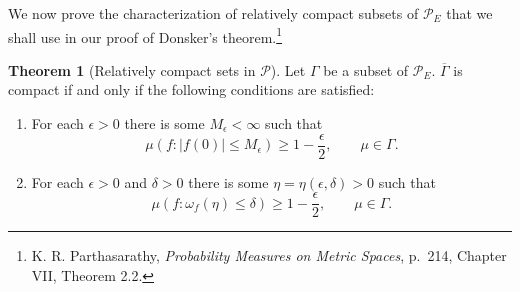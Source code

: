\documentclass{article}
\theoremstyle{definition}
\newtheorem{theorem}{Theorem}
\theoremstyle{definition}
\begin{document}
We now prove the characterization of relatively compact subsets of $\mathscr{P}_E$ that we shall use in our proof of Donsker's theorem.\footnote{K. R.
Parthasarathy, {\em Probability Measures on Metric Spaces}, p.~214, Chapter VII, Theorem 2.2.}

\begin{theorem}[Relatively compact sets in $\mathscr{P}$]
Let $\Gamma$ be a subset of $\mathscr{P}_E$. $\overline{\Gamma}$ is compact if and only if the following conditions are satisfied:
\begin{enumerate}
\item For each $\epsilon>0$ there is some $M_\epsilon<\infty$ such that 
\[
\mu(f:|f(0)| \leq M_\epsilon) \geq 1-\frac{\epsilon}{2},\qquad \mu \in \Gamma.
\]
\item For each $\epsilon>0$ and $\delta>0$ there is some $\eta = \eta(\epsilon,\delta)>0$ such that 
\[
\mu(f : \omega_f(\eta) \leq \delta) \geq 1-\frac{\epsilon}{2},\qquad \mu \in \Gamma.
\]
\end{enumerate}
\label{theorem22}
\end{theorem}
\end{document}
